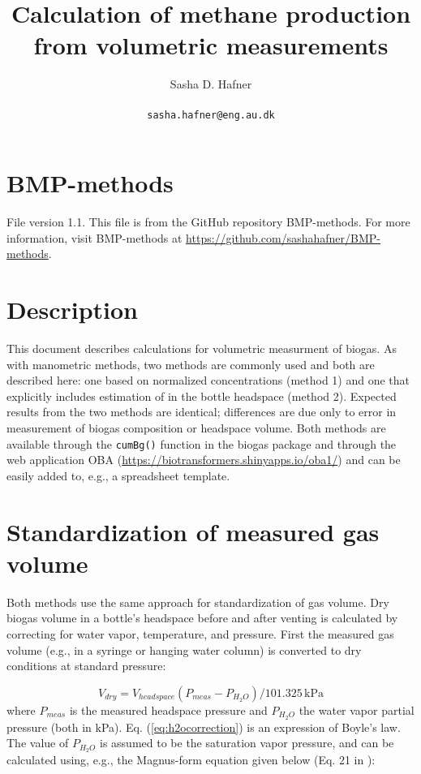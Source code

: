 \documentclass[]{article}
\title {Calculation of methane production from volumetric measurements}
\author{Sasha D. Hafner\\
\\
\texttt{sasha.hafner@eng.au.dk}
}
\newcommand{\unit}[1]{\ensuremath{\, \mathrm{#1}}}
\begin{document}
\maketitle

\section{BMP-methods}
File version 1.1. 
This file is from the GitHub repository BMP-methods.
For more information, visit BMP-methods at \url{https://github.com/sashahafner/BMP-methods}.

\section{Description}
This document describes calculations for volumetric measurment of biogas.
As with manometric methods, two methods are commonly used and both are described here: one based on normalized  concentrations (method 1) and one that explicitly includes estimation of  in the bottle headspace (method 2).
Expected results from the two methods are identical; differences are due only to error in measurement of biogas composition or headspace volume.
Both methods are available through the \texttt{cumBg()} function in the biogas package \cite{softwarex} and through the web application OBA (\url{https://biotransformers.shinyapps.io/oba1/}) and can be easily added to, e.g., a spreadsheet template.

\section{Standardization of measured gas volume}
Both methods use the same approach for standardization of gas volume.
Dry biogas volume in a bottle's headspace before and after venting is calculated by correcting for water vapor, temperature, and pressure.
First the measured gas volume (e.g., in a syringe or hanging water column) is converted to dry conditions at standard pressure:

\begin{equation}
  \label{eq:h2ocorrection}
  V_{dry} = V_{headspace}(P_{meas} - P_{H_2O})/101.325 \unit{kPa}
\end{equation}
where $P_{meas}$ is the measured headspace pressure and $P_{H_2O}$ the water vapor partial pressure (both in kPa).
Eq. (\ref{eq:h2ocorrection}) is an expression of Boyle's law.
The value of $P_{H_2O}$ is assumed to be the saturation vapor pressure, and can be calculated using, e.g., the Magnus-form equation given below (Eq. 21 in \cite{magnus}):
\end{document}
